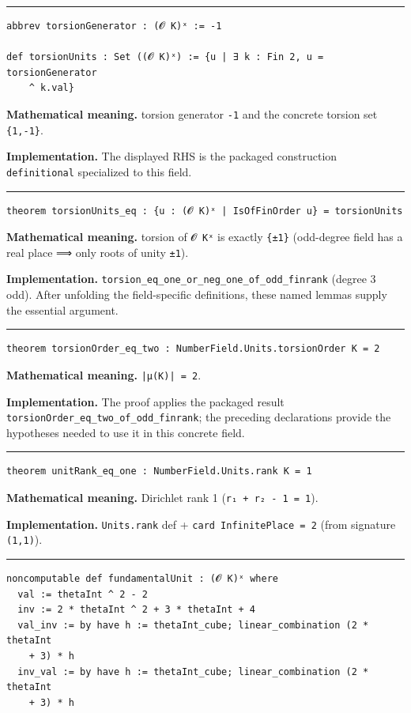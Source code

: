\documentclass[UTF8,a4paper,11pt,fontset=fandol]{ctexart}
\theoremstyle{definition}
\newcommand{\statementsep}{\par\medskip\hrule\medskip}
\begin{document}
\statementsep
\begin{verbatim}
abbrev torsionGenerator : (𝓞 K)ˣ := -1

def torsionUnits : Set ((𝓞 K)ˣ) := {u | ∃ k : Fin 2, u = torsionGenerator
    ^ k.val}
\end{verbatim}
\noindent\textbf{Mathematical meaning.} torsion generator \texttt{-1} and the concrete torsion set \texttt{\{1,-1\}}.\par
\noindent\textbf{Implementation.} The displayed RHS is the packaged construction \texttt{definitional} specialized to this field.\par
\statementsep
\begin{verbatim}
theorem torsionUnits_eq : {u : (𝓞 K)ˣ | IsOfFinOrder u} = torsionUnits
\end{verbatim}
\noindent\textbf{Mathematical meaning.} torsion of \texttt{𝓞 Kˣ} is exactly \texttt{\{±1\}} (odd-degree field has a real place ⟹ only roots of unity \texttt{±1}).\par
\noindent\textbf{Implementation.} \texttt{torsion\_\allowbreak{}eq\_\allowbreak{}one\_\allowbreak{}or\_\allowbreak{}neg\_\allowbreak{}one\_\allowbreak{}of\_\allowbreak{}odd\_\allowbreak{}finrank} (degree 3 odd). After unfolding the field-specific definitions, these named lemmas supply the essential argument.\par
\statementsep
\begin{verbatim}
theorem torsionOrder_eq_two : NumberField.Units.torsionOrder K = 2
\end{verbatim}
\noindent\textbf{Mathematical meaning.} \texttt{|μ(K)| = 2}.\par
\noindent\textbf{Implementation.} The proof applies the packaged result \texttt{torsionOrder\_\allowbreak{}eq\_\allowbreak{}two\_\allowbreak{}of\_\allowbreak{}odd\_\allowbreak{}finrank}; the preceding declarations provide the hypotheses needed to use it in this concrete field.\par
\statementsep
\begin{verbatim}
theorem unitRank_eq_one : NumberField.Units.rank K = 1
\end{verbatim}
\noindent\textbf{Mathematical meaning.} Dirichlet rank 1 (\texttt{r₁ + r₂ - 1 = 1}).\par
\noindent\textbf{Implementation.} \texttt{Units.\allowbreak{}rank} def + \texttt{card InfinitePlace = 2} (from signature \texttt{(1,1)}).\par
\statementsep
\begin{verbatim}
noncomputable def fundamentalUnit : (𝓞 K)ˣ where
  val := thetaInt ^ 2 - 2
  inv := 2 * thetaInt ^ 2 + 3 * thetaInt + 4
  val_inv := by have h := thetaInt_cube; linear_combination (2 * thetaInt
    + 3) * h
  inv_val := by have h := thetaInt_cube; linear_combination (2 * thetaInt
    + 3) * h
\end{verbatim}
\end{document}
